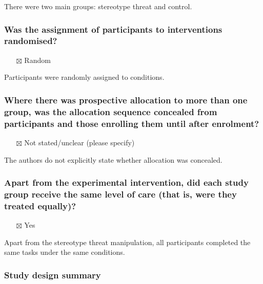 \documentclass[
  doc, a4paper]{apa7}
\providecommand{\tightlist}{%
  \setlength{\itemsep}{0pt}\setlength{\parskip}{0pt}}
\begin{document}
There were two main groups: stereotype threat and control.

\subsubsection{Was the assignment of participants to interventions randomised?}\label{was-the-assignment-of-participants-to-interventions-randomised}

\begin{itemize}
\tightlist
\item[$\boxtimes$]
  Random
\end{itemize}

Participants were randomly assigned to conditions.

\subsubsection{Where there was prospective allocation to more than one group, was the allocation sequence concealed from participants and those enrolling them until after enrolment?}\label{where-there-was-prospective-allocation-to-more-than-one-group-was-the-allocation-sequence-concealed-from-participants-and-those-enrolling-them-until-after-enrolment}

\begin{itemize}
\tightlist
\item[$\boxtimes$]
  Not stated/unclear (please specify)
\end{itemize}

The authors do not explicitly state whether allocation was concealed.

\subsubsection{Apart from the experimental intervention, did each study group receive the same level of care (that is, were they treated equally)?}\label{apart-from-the-experimental-intervention-did-each-study-group-receive-the-same-level-of-care-that-is-were-they-treated-equally}

\begin{itemize}
\tightlist
\item[$\boxtimes$]
  Yes
\end{itemize}

Apart from the stereotype threat manipulation, all participants completed the same tasks under the same conditions.

\subsubsection{Study design summary}\label{study-design-summary}
\end{document}
